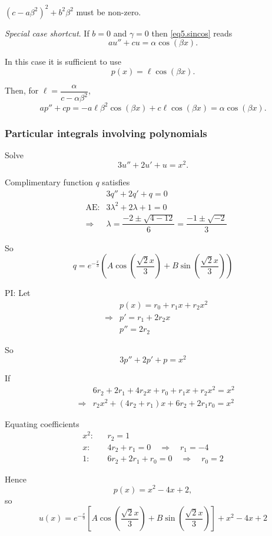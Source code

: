 \begin{note}
 $(c-a\beta^2)^2 + b^2\beta^2$ must be non-zero.
\end{note}


 \emph{Special case shortcut}. If $b=0$ and $\gamma=0$ then \eqref{eq5.sincos} reads
 \[
  au'' + cu = \alpha \cos(\beta x).
 \]
 
 In this case it is sufficient to use
 \[
  p(x) = \ell \cos(\beta x).
 \]

Then, for $\ell = \dfrac{\alpha}{c-\alpha \beta^2}$,
\[
 ap'' + cp =
 -a \ell \beta^2 \cos(\beta x) + c \ell \cos(\beta x) = \alpha \cos(\beta x).
\]



\subsubsection*{Particular integrals involving polynomials}

\begin{example}  Solve
  \[
    3u'' + 2u' + u = x^2.
  \]

  Complimentary function $q$ satisfies
 \begin{eqnarray*}
 && 3q'' + 2q' + q = 0\\
 &\text{AE:}& 3\lambda^2 + 2\lambda + 1 = 0\\
&\Rightarrow& \lambda = \dfrac{-2 \pm \sqrt{4-12}}{6} = \dfrac{-1 \pm \sqrt{-2}}{3}
 \end{eqnarray*}
 
 So
 \[
  q = e^{-\frac{x}{3}} \left(
  A \cos \left(\dfrac{\sqrt{2}x}{3}\right) +  B \sin \left(\dfrac{\sqrt{2}x}{3}\right)
  \right)
 \]

 PI: Let
 \begin{eqnarray*}
  && p(x) = r_0 + r_1 x + r_2 x^2\\
  &\Rightarrow& p' = r_1 + 2 r_2 x\\
  && p'' = 2r_2
 \end{eqnarray*}

So
\[
 3p'' + 2p' + p = x^2
\]

If
\begin{eqnarray*}
&& 6r_2 + 2r_1 + 4r_2x + r_0 + r_1 x + r_2 x^2 = x^2\\
&\Rightarrow& r_2 x^2 + (4r_2+r_1)x + 6r_2 + 2r_1 r_0 = x^2
\end{eqnarray*}

Equating coefficients
\begin{eqnarray*}
 x^2: && r_2 = 1 \\
 x: && 4r_2+r_1 = 0 \quad \Rightarrow \quad r_1=-4 \\
 1: && 6r_2+ 2r_1 + r_0= 0 \quad \Rightarrow \quad r_0=2
\end{eqnarray*}

Hence
\[
 p(x) = x^2 - 4x + 2,
\]
so
\[
 u(x) = e^{-\frac{x}{3}} \left[
  A \cos \left(\dfrac{\sqrt{2}x}{3}\right) +  B \sin \left(\dfrac{\sqrt{2}x}{3}\right)
  \right] + x^2 - 4x + 2
\]

\end{example}

